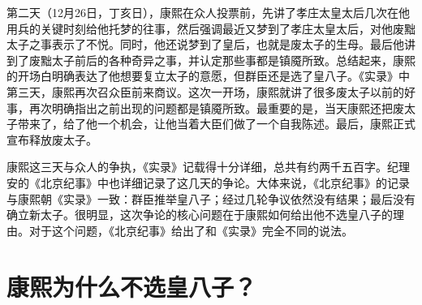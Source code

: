
第二天（12月26日，丁亥日），康熙在众人投票前，先讲了孝庄太皇太后几次在他用兵的关键时刻给他托梦的往事，然后强调最近又梦到了孝庄太皇太后，对他废黜太子之事表示了不悦。同时，他还说梦到了皇后，也就是废太子的生母。最后他讲到了废黜太子前后的各种奇异之事，并认定那些事都是镇魇所致。总结起来，康熙的开场白明确表达了他想要复立太子的意愿，但群臣还是选了皇八子。《实录》中第三天，康熙再次召众臣前来商议。这次一开场，康熙就讲了很多废太子以前的好事，再次明确指出之前出现的问题都是镇魇所致。最重要的是，当天康熙还把废太子带来了，给了他一个机会，让他当着大臣们做了一个自我陈述。最后，康熙正式宣布释放废太子。



康熙这三天与众人的争执，《实录》记载得十分详细，总共有约两千五百字。纪理安的《北京纪事》中也详细记录了这几天的争论。大体来说，《北京纪事》的记录与康熙朝《实录》一致：群臣推举皇八子；经过几轮争议依然没有结果；最后没有确立新太子。很明显，这次争论的核心问题在于康熙如何给出他不选皇八子的理由。对于这个问题，《北京纪事》给出了和《实录》完全不同的说法。


\begin{sectionnotes}












\end{sectionnotes}
\section{康熙为什么不选皇八子？}


